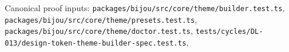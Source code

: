\begin{itemize}
  Canonical proof inputs: \texttt{p\allowbreak{}a\allowbreak{}c\allowbreak{}k\allowbreak{}a\allowbreak{}g\allowbreak{}e\allowbreak{}s\allowbreak{}/\allowbreak{}b\allowbreak{}i\allowbreak{}j\allowbreak{}o\allowbreak{}u\allowbreak{}/\allowbreak{}s\allowbreak{}r\allowbreak{}c\allowbreak{}/\allowbreak{}c\allowbreak{}o\allowbreak{}r\allowbreak{}e\allowbreak{}/\allowbreak{}t\allowbreak{}h\allowbreak{}e\allowbreak{}m\allowbreak{}e\allowbreak{}/\allowbreak{}b\allowbreak{}u\allowbreak{}i\allowbreak{}l\allowbreak{}d\allowbreak{}e\allowbreak{}r\allowbreak{}.\allowbreak{}t\allowbreak{}e\allowbreak{}s\allowbreak{}t\allowbreak{}.\allowbreak{}t\allowbreak{}s}, \texttt{p\allowbreak{}a\allowbreak{}c\allowbreak{}k\allowbreak{}a\allowbreak{}g\allowbreak{}e\allowbreak{}s\allowbreak{}/\allowbreak{}b\allowbreak{}i\allowbreak{}j\allowbreak{}o\allowbreak{}u\allowbreak{}/\allowbreak{}s\allowbreak{}r\allowbreak{}c\allowbreak{}/\allowbreak{}c\allowbreak{}o\allowbreak{}r\allowbreak{}e\allowbreak{}/\allowbreak{}t\allowbreak{}h\allowbreak{}e\allowbreak{}m\allowbreak{}e\allowbreak{}/\allowbreak{}p\allowbreak{}r\allowbreak{}e\allowbreak{}s\allowbreak{}e\allowbreak{}t\allowbreak{}s\allowbreak{}.\allowbreak{}t\allowbreak{}e\allowbreak{}s\allowbreak{}t\allowbreak{}.\allowbreak{}t\allowbreak{}s}, \texttt{p\allowbreak{}a\allowbreak{}c\allowbreak{}k\allowbreak{}a\allowbreak{}g\allowbreak{}e\allowbreak{}s\allowbreak{}/\allowbreak{}b\allowbreak{}i\allowbreak{}j\allowbreak{}o\allowbreak{}u\allowbreak{}/\allowbreak{}s\allowbreak{}r\allowbreak{}c\allowbreak{}/\allowbreak{}c\allowbreak{}o\allowbreak{}r\allowbreak{}e\allowbreak{}/\allowbreak{}t\allowbreak{}h\allowbreak{}e\allowbreak{}m\allowbreak{}e\allowbreak{}/\allowbreak{}d\allowbreak{}o\allowbreak{}c\allowbreak{}t\allowbreak{}o\allowbreak{}r\allowbreak{}.\allowbreak{}t\allowbreak{}e\allowbreak{}s\allowbreak{}t\allowbreak{}.\allowbreak{}t\allowbreak{}s}, \texttt{t\allowbreak{}e\allowbreak{}s\allowbreak{}t\allowbreak{}s\allowbreak{}/\allowbreak{}c\allowbreak{}y\allowbreak{}c\allowbreak{}l\allowbreak{}e\allowbreak{}s\allowbreak{}/\allowbreak{}D\allowbreak{}L\allowbreak{}-\allowbreak{}0\allowbreak{}1\allowbreak{}3\allowbreak{}/\allowbreak{}d\allowbreak{}e\allowbreak{}s\allowbreak{}i\allowbreak{}g\allowbreak{}n\allowbreak{}-\allowbreak{}t\allowbreak{}o\allowbreak{}k\allowbreak{}e\allowbreak{}n\allowbreak{}-\allowbreak{}t\allowbreak{}h\allowbreak{}e\allowbreak{}m\allowbreak{}e\allowbreak{}-\allowbreak{}b\allowbreak{}u\allowbreak{}i\allowbreak{}l\allowbreak{}d\allowbreak{}e\allowbreak{}r\allowbreak{}-\allowbreak{}s\allowbreak{}p\allowbreak{}e\allowbreak{}c\allowbreak{}.\allowbreak{}t\allowbreak{}e\allowbreak{}s\allowbreak{}t\allowbreak{}.\allowbreak{}t\allowbreak{}s}, 
\end{itemize}
